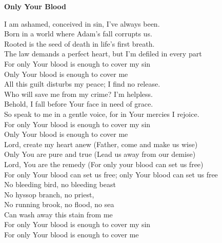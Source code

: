 \textbf{Only Your Blood}

I am ashamed, conceived in sin, I’ve always been. \\
Born in a world where Adam’s fall corrupts us. \\
Rooted is the seed of death in life’s first breath. \\
The law demands a perfect heart, but I'm defiled in every part \\

For only Your blood is enough to cover my sin \\
Only Your blood is enough to cover me \\

All this guilt disturbs my peace; I find no release. \\
Who will save me from my crime? I’m helpless. \\
Behold, I fall before Your face in need of grace. \\
So speak to me in a gentle voice, for in Your mercies I rejoice. \\

For only Your blood is enough to cover my sin \\
Only Your blood is enough to cover me \\

Lord, create my heart anew (Father, come and make us wise) \\
Only You are pure and true (Lead us away from our demise) \\
Lord, You are the remedy (For only your blood can set us free) \\

For only Your blood can set us free; only Your blood can set us free \\

No bleeding bird, no bleeding beast \\
No hyssop branch, no priest, \\
No running brook, no flood, no sea \\
Can wash away this stain from me \\

For only Your blood is enough to cover my sin \\
For only Your blood is enough to cover me \\
